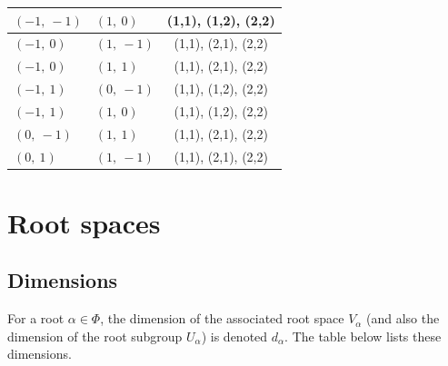 \documentclass[11pt]{article}
\theoremstyle{definition}
\begin{document}
\begin{longtable}{|l|l|c|}
    \hline
    $\left( -1, \  -1\right)$ & $\left( 1, \  0\right)$ & (1,1), (1,2), (2,2) \\
    \hline
    $\left( -1, \  0\right)$ & $\left( 1, \  -1\right)$ & (1,1), (2,1), (2,2) \\
    \hline
    $\left( -1, \  0\right)$ & $\left( 1, \  1\right)$ & (1,1), (2,1), (2,2) \\
    \hline
    $\left( -1, \  1\right)$ & $\left( 0, \  -1\right)$ & (1,1), (1,2), (2,2) \\
    \hline
    $\left( -1, \  1\right)$ & $\left( 1, \  0\right)$ & (1,1), (1,2), (2,2) \\
    \hline
    $\left( 0, \  -1\right)$ & $\left( 1, \  1\right)$ & (1,1), (2,1), (2,2) \\
    \hline
    $\left( 0, \  1\right)$ & $\left( 1, \  -1\right)$ & (1,1), (2,1), (2,2) \\
    \hline
\end{longtable}

\fi

\newpage
\section{Root spaces}

\subsection{Dimensions}

For a root $\alpha \in \Phi$, the dimension of the associated root space $V_\alpha$ (and also the dimension of the root subgroup $U_\alpha$) is denoted $d_\alpha$. The table below lists these dimensions.

\bigskip
\end{document}
